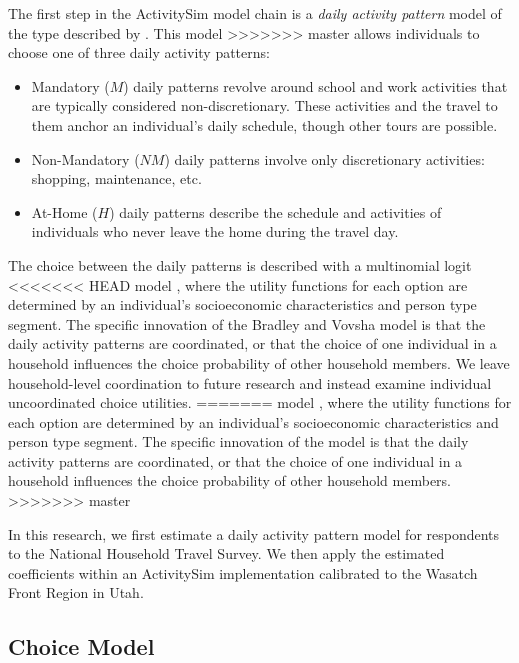 \documentclass[3p, authoryear, review]{elsarticle} %
\providecommand{\tightlist}{%
  \setlength{\itemsep}{0pt}\setlength{\parskip}{0pt}}
\begin{document}
The first step in the ActivitySim model chain is a \emph{daily activity pattern}
model of the type described by \citet{Bradley2005}. This model
>>>>>>> master
allows individuals to choose one of three daily activity patterns:

\begin{itemize}
\tightlist
\item
  Mandatory (\(M\)) daily patterns revolve around school and work activities that
  are typically considered non-discretionary. These activities and the travel
  to them anchor an individual's daily schedule, though other tours are possible.
\item
  Non-Mandatory (\(NM\)) daily patterns involve only discretionary activities:
  shopping, maintenance, etc.
\item
  At-Home (\(H\)) daily patterns describe the schedule and activities of
  individuals who never leave the home during the travel day.
\end{itemize}

The choice between the daily patterns is described with a multinomial logit
<<<<<<< HEAD
model \citet{Domencich1975}, where the utility functions for each option are
determined by an individual's socioeconomic characteristics and person type
segment. The specific innovation of the Bradley and Vovsha model
\citet{Bradley2005} is that the daily activity patterns are coordinated, or that
the choice of one individual in a household influences the choice probability of
other household members. We leave household-level coordination to future
research and instead examine individual uncoordinated choice utilities.
=======
model \citep{Domencich1975}, where the utility functions for each option are
determined by an individual's socioeconomic characteristics and person type
segment. The specific innovation of the \citet{Bradley2005} model is that the daily
activity patterns are coordinated, or that the choice of one individual in a
household influences the choice probability of other household members.
>>>>>>> master

In this research, we first estimate a daily activity pattern model for
respondents to the National Household Travel Survey. We then apply the estimated
coefficients within an ActivitySim implementation calibrated to the Wasatch Front
Region in Utah.

\hypertarget{choice-model}{%
\subsection{Choice Model}\label{choice-model}}
\end{document}
